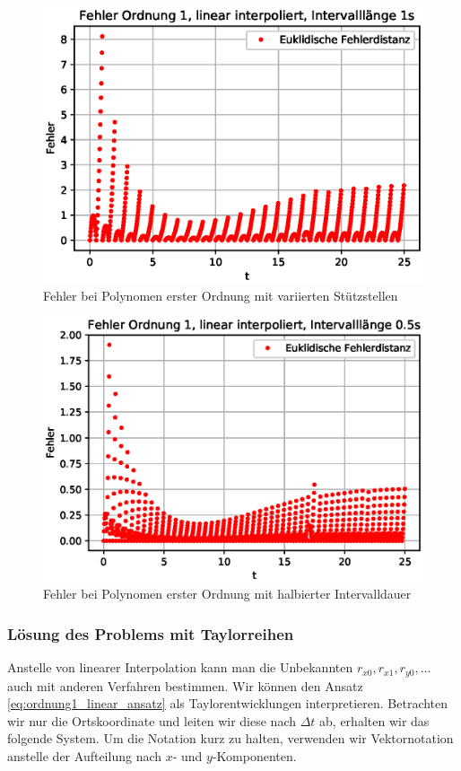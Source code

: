 \begin{figure}
	\centering
	\includegraphics[scale=0.7]{papers/perturbation/bilder/perturbation_fig7.eps}
	\caption{Fehler bei Polynomen erster Ordnung mit variierten Stützstellen}
	\label{fig:ordnung1_linear_error_B}
\end{figure}

\begin{figure}
	\centering
	\includegraphics[scale=0.7]{papers/perturbation/bilder/perturbation_fig8.eps}
	\caption{Fehler bei Polynomen erster Ordnung mit halbierter Intervalldauer}
	\label{fig:ordnung1_linear_error_C}
\end{figure}

\subsubsection{Lösung des Problems mit Taylorreihen}
Anstelle von linearer Interpolation kann man die Unbekannten $r_{x0}, r_{x1}, r_{y0}, \dots$ auch mit anderen Verfahren bestimmen. 
Wir können den Ansatz \eqref{eq:ordnung1_linear_ansatz} als Taylorentwicklungen interpretieren. 
Betrachten wir nur die Ortskoordinate und leiten wir diese nach $\Delta t$ ab, erhalten wir das folgende System. Um die Notation kurz zu halten, verwenden wir Vektornotation anstelle der Aufteilung nach $x$- und $y$-Komponenten.

